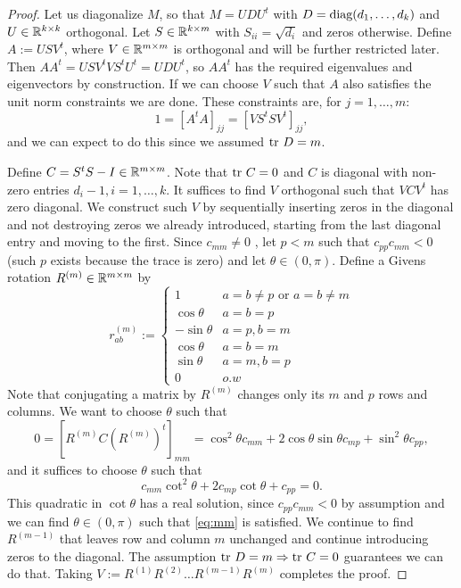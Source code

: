 \documentclass{amsart}
\numberwithin{equation}{section}
\begin{document}
\free
\begin{proof}
  Let us diagonalize $M$, so that $M = U D U^t$ with $D =
  \textup{diag}(d_1,\dots,d_k)$ and $U \in \mathbb{R}^{k \times k }$ orthogonal. Let
  $S \in \mathbb{R}^{k \times m}$ with $S_{ii} = \sqrt{d_{i}}$ and zeros
  otherwise. Define $A:= U S V^t$, where $V \in \mathbb{R}^{m \times m}$ is
  orthogonal and will be further restricted later. Then $AA^t = U
  SV^tVS^t U^t = UDU^t$, so $AA^t$ has the required eigenvalues and
  eigenvectors by construction. If we can choose $V$ such that $A$
  also satisfies the unit norm constraints we are done. These
  constraints are, for $j=1,\dots,m$:
  \begin{equation}\label{eq:V constraints}
   1 = [A^tA]_{jj} = [V S^tS V^t]_{jj},
  \end{equation}
  and we can expect to do this since we assumed $\textup{tr}\ D = m$.

  Define $C = S^tS - I \in \mathbb{R}^{m \times m}$. Note that $\textup{tr}\ C = 0$ and
  $C$ is diagonal with non-zero entries $d_i-1,i=1,\dots,k$. It suffices
  to find $V$ orthogonal such that $V C V^t$ has zero diagonal. We
  construct such $V$ by sequentially inserting zeros in the diagonal
  and not destroying zeros we already introduced, starting from the
  last diagonal entry and moving to the first. Since $c_{mm} \neq 0$ ,
  let $p < m$ such that $c_{pp}c_{mm} < 0$ (such $p$ exists because
  the trace is zero) and let $\theta \in (0,\pi)$. Define a Givens
  rotation $R^{(m)} \in \mathbb{R}^{m \times m}$ by
  \begin{equation*}
    r^{(m)}_{ab} :=
    \begin{cases}
      1 & a = b \neq p \text{ or } a = b \neq m \\
      \cos \theta & a = b = p  \\
     -\sin \theta & a = p, b = m\\
      \cos \theta & a = b = m \\
      \sin \theta & a = m, b = p \\ 
      0 & o.w
    \end{cases}
  \end{equation*}
  Note that conjugating a matrix by $R^{(m)}$ changes only its $m$ and
  $p$ rows and columns. We want to choose $\theta$ such that
  \begin{equation}\label{eq:mm}
    0 = [R^{(m)} C (R^{(m)})^t]_{mm} = \cos^2 \theta c_{mm} + 2\cos \theta \sin
    \theta c_{mp} + \sin^2\theta c_{pp},
  \end{equation}
  and it suffices to choose $\theta$ such that
  \begin{equation*}
    c_{mm} \cot^2 \theta + 2 c_{mp} \cot \theta + c_{pp} = 0.
  \end{equation*}
  This quadratic in $\cot\theta$ has a real solution, since
  $c_{pp}c_{mm} < 0$ by assumption and we can find $\theta \in
  (0,\pi)$ such that \eqref{eq:mm} is satisfied. We continue to find
  $R^{(m-1)}$ that leaves row and column $m$ unchanged and
  continue introducing zeros to the diagonal. The assumption $\textup{tr}\ D =
  m \Rightarrow \textup{tr}\ C = 0$ guarantees we can do that. Taking $V:=
  R^{(1)} R^{(2)} \dots R^{(m-1)}R^{(m)}$ completes the proof.
\end{proof}
\end{document}
